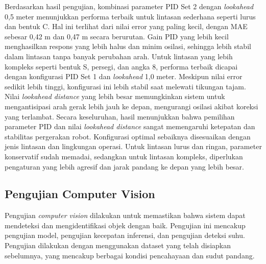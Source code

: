 Berdasarkan hasil pengujian, kombinasi parameter PID Set 2 dengan \textit{lookahead}
0{,}5 meter menunjukkan performa terbaik untuk lintasan sederhana seperti lurus dan
bentuk C. Hal ini terlihat dari nilai error yang paling kecil, dengan MAE sebesar
0{,42} m dan 0{,47} m secara berurutan. Gain PID yang lebih kecil menghasilkan
respons yang lebih halus dan minim osilasi, sehingga lebih stabil dalam lintasan
tanpa banyak perubahan arah. Untuk lintasan yang lebih kompleks seperti bentuk S,
persegi, dan angka 8, performa terbaik dicapai dengan konfigurasi PID Set 1 dan \textit{lookahead}
1{,}0 meter. Meskipun nilai error sedikit lebih tinggi, konfigurasi ini lebih
stabil saat melewati tikungan tajam. Nilai \textit{lookahead distance} yang
lebih besar memungkinkan sistem untuk mengantisipasi arah gerak lebih jauh ke
depan, mengurangi osilasi akibat koreksi yang terlambat. Secara keseluruhan, hasil
menunjukkan bahwa pemilihan parameter PID dan nilai \textit{lookahead distance}
sangat memengaruhi ketepatan dan stabilitas pergerakan robot. Konfigurasi optimal
sebaiknya disesuaikan dengan jenis lintasan dan lingkungan operasi. Untuk
lintasan lurus dan ringan, parameter konservatif sudah memadai, sedangkan untuk
lintasan kompleks, diperlukan pengaturan yang lebih agresif dan jarak pandang ke
depan yang lebih besar.

\subsection{Pengujian Computer Vision}
Pengujian \emph{computer vision} dilakukan untuk memastikan bahwa sistem dapat
mendeteksi dan mengidentifikasi objek dengan baik. Pengujian ini mencakup pengujian
model, pengujian kecepatan inferensi, dan pengujian deteksi suhu. Pengujian
dilakukan dengan menggunakan dataset yang telah disiapkan sebelumnya, yang mencakup
berbagai kondisi pencahayaan dan sudut pandang.

